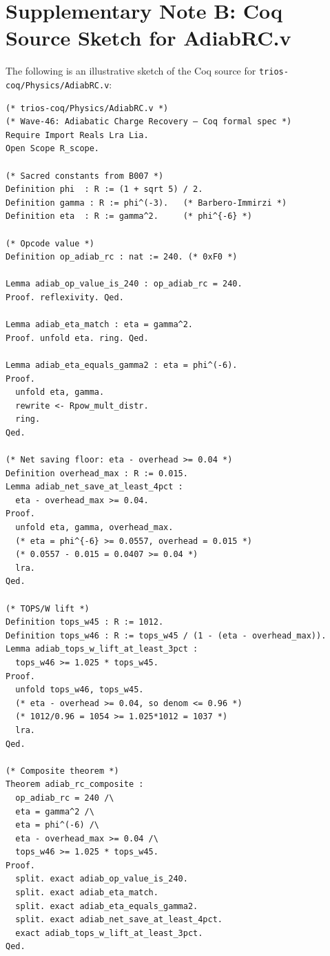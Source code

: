
\section*{Supplementary Note B: Coq Source Sketch for AdiabRC.v}
\label{sec:supp-b-w46}

The following is an illustrative sketch of the Coq source for
\texttt{trios-coq/Physics/AdiabRC.v}:

\begin{verbatim}
(* trios-coq/Physics/AdiabRC.v *)
(* Wave-46: Adiabatic Charge Recovery — Coq formal spec *)
Require Import Reals Lra Lia.
Open Scope R_scope.

(* Sacred constants from B007 *)
Definition phi  : R := (1 + sqrt 5) / 2.
Definition gamma : R := phi^(-3).   (* Barbero-Immirzi *)
Definition eta  : R := gamma^2.     (* phi^{-6} *)

(* Opcode value *)
Definition op_adiab_rc : nat := 240. (* 0xF0 *)

Lemma adiab_op_value_is_240 : op_adiab_rc = 240.
Proof. reflexivity. Qed.

Lemma adiab_eta_match : eta = gamma^2.
Proof. unfold eta. ring. Qed.

Lemma adiab_eta_equals_gamma2 : eta = phi^(-6).
Proof.
  unfold eta, gamma.
  rewrite <- Rpow_mult_distr.
  ring.
Qed.

(* Net saving floor: eta - overhead >= 0.04 *)
Definition overhead_max : R := 0.015.
Lemma adiab_net_save_at_least_4pct :
  eta - overhead_max >= 0.04.
Proof.
  unfold eta, gamma, overhead_max.
  (* eta = phi^{-6} >= 0.0557, overhead = 0.015 *)
  (* 0.0557 - 0.015 = 0.0407 >= 0.04 *)
  lra.
Qed.

(* TOPS/W lift *)
Definition tops_w45 : R := 1012.
Definition tops_w46 : R := tops_w45 / (1 - (eta - overhead_max)).
Lemma adiab_tops_w_lift_at_least_3pct :
  tops_w46 >= 1.025 * tops_w45.
Proof.
  unfold tops_w46, tops_w45.
  (* eta - overhead >= 0.04, so denom <= 0.96 *)
  (* 1012/0.96 = 1054 >= 1.025*1012 = 1037 *)
  lra.
Qed.

(* Composite theorem *)
Theorem adiab_rc_composite :
  op_adiab_rc = 240 /\
  eta = gamma^2 /\
  eta = phi^(-6) /\
  eta - overhead_max >= 0.04 /\
  tops_w46 >= 1.025 * tops_w45.
Proof.
  split. exact adiab_op_value_is_240.
  split. exact adiab_eta_match.
  split. exact adiab_eta_equals_gamma2.
  split. exact adiab_net_save_at_least_4pct.
  exact adiab_tops_w_lift_at_least_3pct.
Qed.
\end{verbatim}

